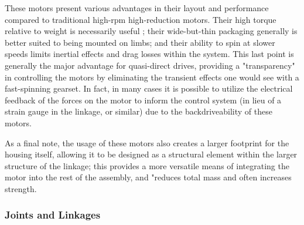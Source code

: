 \documentclass{article}
\begin{document}
These motors present various advantages in their layout and performance compared to traditional high-rpm high-reduction motors. Their high torque relative to weight is necessarily useful \cite{katz_low_2018}; %
their wide-but-thin packaging generally is better suited to being mounted on limbs; and their ability to spin at slower speeds limits inertial effects and drag losses within the system. This last point is generally the major advantage for quasi-direct drives, providing a "transparency" \cite{seok_actuator_2012} %
in controlling the motors by eliminating the transient effects one would see with a fast-spinning gearset. In fact, in many cases it is possible to utilize the electrical feedback of the forces on the motor to inform the control system (in lieu of a strain gauge in the linkage, or similar) due to the backdriveability of these motors. \cite{katz_low_2018} %


As a final note, the usage of these motors also creates a larger footprint for the housing itself, allowing it to be designed as a structural element within the larger structure of the linkage; this provides a more versatile means of integrating the motor into the rest of the assembly, and "reduces total mass and often increases strength. \cite{mckenzie_design_2012} %

\subsubsection{Joints and Linkages}
\end{document}
